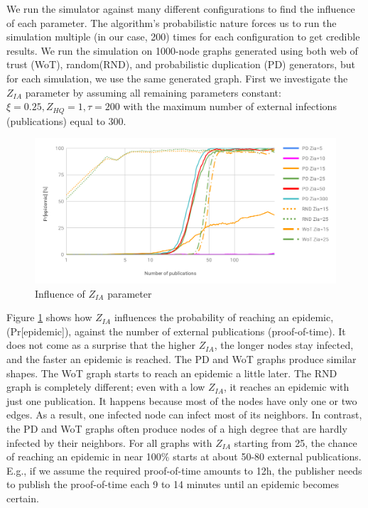 We run the simulator against many different configurations to find the influence of each parameter. The algorithm's probabilistic nature forces us to run the simulation multiple (in our case, 200) times for each configuration to get credible results. We run the simulation on 1000-node graphs generated using both web of trust (WoT), random(RND), and probabilistic duplication (PD) generators, but for each simulation, we use the same generated graph. First we investigate the $Z_{IA}$ parameter by assuming all remaining parameters constant: $\xi=0.25, Z_{HQ} = 1, \tau=200$ with the maximum number of external infections (publications) equal to 300.
\begin{figure}[h!]
    \includegraphics[width=\textwidth]{img/influence-of-zia.png}
    \centering
    \caption{Influence of $Z_{IA}$ parameter}
    \label{fig:influence-of-zia}
\end{figure} 
Figure \ref{fig:influence-of-zia} shows how $Z_{IA}$ influences the probability of reaching an epidemic, (Pr[epidemic]), against the number of external publications (proof-of-time). It does not come as a surprise that the higher $Z_{IA}$, the longer nodes stay infected, and the faster an epidemic is reached. The PD and WoT graphs produce similar shapes. The WoT graph starts to reach an epidemic a little later. 
The RND graph is completely different; even with a low $Z_{IA}$, it reaches an epidemic with just one publication. It happens because most of the nodes have only one or two edges. As a result, one infected node can infect most of its neighbors. In contrast, the PD and WoT graphs often produce nodes of a high degree that are hardly infected by their neighbors.
For all graphs with $Z_{IA}$ starting from 25, the chance of reaching an epidemic in near 100\% starts at about 50-80 external publications. E.g., if we assume the required proof-of-time amounts to 12h, the publisher needs to publish the proof-of-time each 9 to 14 minutes until an epidemic becomes certain.

